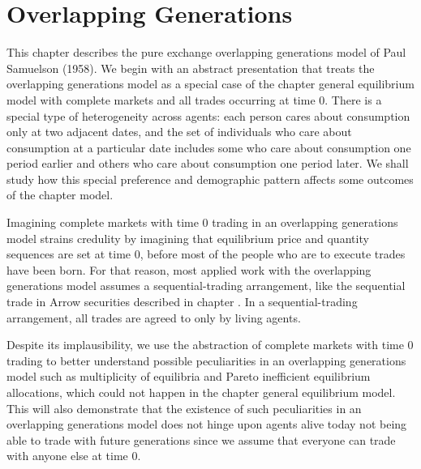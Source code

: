 

%




\def\toone{{t+1}}
\def\ttwo{{t+2}}
\def\tthree{{t+3}}
\def\Tone{{T+1}}
\def\TTT{{T-1}}
\def\rtr{{\rm tr}}
\def\tone{{t+1}}



\chapter{Overlapping Generations\label{ogmodels}}

This chapter describes the pure exchange overlapping generations
model of Paul Samuelson (1958).
 We begin with an
abstract presentation  that treats the overlapping
generations model as a special case of the chapter 
general equilibrium model with complete markets and all
trades occurring at time $0$.
There is a special  type of heterogeneity across
agents: each person 
cares about consumption only at  two adjacent dates, and the set of
individuals who care about consumption at a particular date
includes some who care about consumption one period earlier and others
who care about consumption one period later.   We shall study
how  this
special preference and demographic  pattern affects some
 outcomes of the chapter  model.

  Imagining
complete markets with time $0$ trading in
an overlapping generations model strains
credulity by imagining  that equilibrium price and quantity sequences
are set at time $0$,
before most of the people who are to execute  trades have been born.
  For that reason, most applied work with the overlapping generations
model assumes a sequential-trading arrangement, like
the sequential trade in Arrow securities described   in chapter
.
In a  sequential-trading arrangement,  all trades are 
agreed to only by living agents.

Despite its implausibility, we use the abstraction of
complete markets with time 0 trading to better understand
possible peculiarities in an overlapping generations model 
such as multiplicity of equilibria and Pareto inefficient
equilibrium allocations, which could not happen in the 
chapter  general equilibrium model. This will 
also demonstrate that the existence of such peculiarities 
in an overlapping generations model does not hinge upon 
agents alive today not being able to trade with future
generations since we assume that everyone can 
trade with anyone else at time 0.

